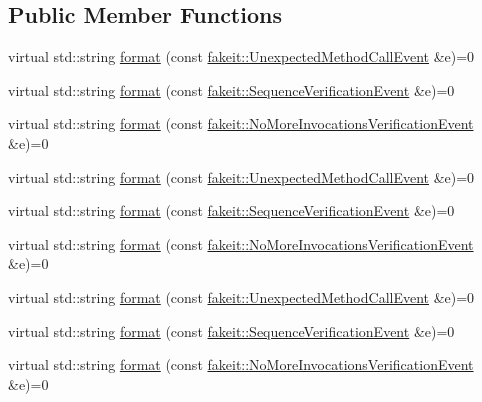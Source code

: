 \subsection*{Public Member Functions}
\begin{DoxyCompactItemize}
\item 
virtual std\+::string \mbox{\hyperlink{structfakeit_1_1EventFormatter_a103815eedb0a69ce7e3565270686bf7b}{format}} (const \mbox{\hyperlink{structfakeit_1_1UnexpectedMethodCallEvent}{fakeit\+::\+Unexpected\+Method\+Call\+Event}} \&e)=0
\item 
virtual std\+::string \mbox{\hyperlink{structfakeit_1_1EventFormatter_a9776a0cb30ddb959b49e1a95ef560946}{format}} (const \mbox{\hyperlink{structfakeit_1_1SequenceVerificationEvent}{fakeit\+::\+Sequence\+Verification\+Event}} \&e)=0
\item 
virtual std\+::string \mbox{\hyperlink{structfakeit_1_1EventFormatter_a2c620c0b788a1c14e8f5ac40dd57d7ad}{format}} (const \mbox{\hyperlink{structfakeit_1_1NoMoreInvocationsVerificationEvent}{fakeit\+::\+No\+More\+Invocations\+Verification\+Event}} \&e)=0
\item 
virtual std\+::string \mbox{\hyperlink{structfakeit_1_1EventFormatter_a103815eedb0a69ce7e3565270686bf7b}{format}} (const \mbox{\hyperlink{structfakeit_1_1UnexpectedMethodCallEvent}{fakeit\+::\+Unexpected\+Method\+Call\+Event}} \&e)=0
\item 
virtual std\+::string \mbox{\hyperlink{structfakeit_1_1EventFormatter_a9776a0cb30ddb959b49e1a95ef560946}{format}} (const \mbox{\hyperlink{structfakeit_1_1SequenceVerificationEvent}{fakeit\+::\+Sequence\+Verification\+Event}} \&e)=0
\item 
virtual std\+::string \mbox{\hyperlink{structfakeit_1_1EventFormatter_a2c620c0b788a1c14e8f5ac40dd57d7ad}{format}} (const \mbox{\hyperlink{structfakeit_1_1NoMoreInvocationsVerificationEvent}{fakeit\+::\+No\+More\+Invocations\+Verification\+Event}} \&e)=0
\item 
virtual std\+::string \mbox{\hyperlink{structfakeit_1_1EventFormatter_a103815eedb0a69ce7e3565270686bf7b}{format}} (const \mbox{\hyperlink{structfakeit_1_1UnexpectedMethodCallEvent}{fakeit\+::\+Unexpected\+Method\+Call\+Event}} \&e)=0
\item 
virtual std\+::string \mbox{\hyperlink{structfakeit_1_1EventFormatter_a9776a0cb30ddb959b49e1a95ef560946}{format}} (const \mbox{\hyperlink{structfakeit_1_1SequenceVerificationEvent}{fakeit\+::\+Sequence\+Verification\+Event}} \&e)=0
\item 
virtual std\+::string \mbox{\hyperlink{structfakeit_1_1EventFormatter_a2c620c0b788a1c14e8f5ac40dd57d7ad}{format}} (const \mbox{\hyperlink{structfakeit_1_1NoMoreInvocationsVerificationEvent}{fakeit\+::\+No\+More\+Invocations\+Verification\+Event}} \&e)=0

\end{DoxyCompactItemize}
